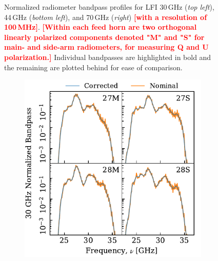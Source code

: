 \documentclass[twocolumn]{aa}
\newcommand{\?}[1]{\textcolor{red}{{\bf [#1]}}}
\begin{document}
\begin{figure}[p]
\begin{subfigure}{0.45\linewidth}
  \end{subfigure}
  \caption{Normalized radiometer bandpass profiles for LFI 30\,GHz (\emph{top
    left}), 44\,GHz (\emph{bottom left}), and 70\,GHz (\emph{right})
    \?{\textbf{with a resolution of 100\,MHz}}. \?{\textbf{Within each feed horn
    are two orthogonal linearly polarized components denoted "M" and "S" for
    main- and side-arm radiometers, for measuring Q and U polarization.}}
    Individual bandpasses are highlighted in bold and the remaining are plotted
    behind for ease of comparison.}
  \label{fig:bp_LFI}
\end{figure}

%
\begin{figure}[p]
  \center
  \begin{subfigure}{0.45\linewidth}
    \includegraphics[width=\linewidth]{figs/bpcorrected_30GHz.pdf}\vspace*{2.cm}

\end{subfigure}
\end{figure}
\end{document}
